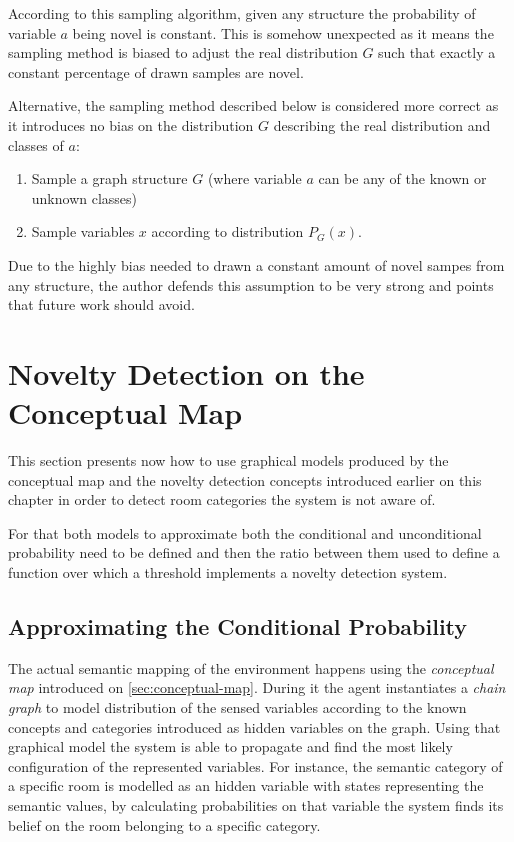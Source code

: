 According to this sampling algorithm, given any structure the probability of
variable $a$ being novel is constant. This is somehow unexpected as it means
the sampling method is biased to adjust the real distribution $G$ such that
exactly a constant percentage of drawn samples are novel.

Alternative, the sampling method described below is considered more correct as
it introduces no bias on the distribution $G$ describing the real distribution
and classes of $a$:
\begin{algorithm}
\begin{enumerate}
\item Sample a graph structure $G$ (where variable $a$ can be any of the known or unknown classes)
\item Sample variables $x$ according to distribution $P_G(x)$.
\end{enumerate}
\end{algorithm}

Due to the highly bias needed to drawn a constant amount of novel sampes from any structure, the
author defends this assumption to be very strong and points that future work should avoid.

 
\section{Novelty Detection on the Conceptual Map}

This section presents now how to use graphical models produced by the conceptual map and the
novelty detection concepts introduced earlier on this chapter in order to detect room categories the
system is not aware of.

For that both models to approximate both the conditional and unconditional probability need to
be defined and then the ratio between them used to define a function over which a threshold
implements a novelty detection system.

\subsection{Approximating the Conditional Probability}
The actual semantic mapping of the environment happens using the \emph{conceptual map}
introduced on \autoref{sec:conceptual-map}. During it the agent instantiates a
\emph{chain graph} to model distribution of the sensed variables according to the known
concepts and categories introduced as hidden variables on the graph. Using that graphical model
the system is able to propagate and find the most likely configuration of the represented
variables. For instance, the semantic category of a specific room is modelled as an hidden variable
with states representing the semantic values, by calculating probabilities on that variable the
system finds its belief on the room belonging to a specific category.

